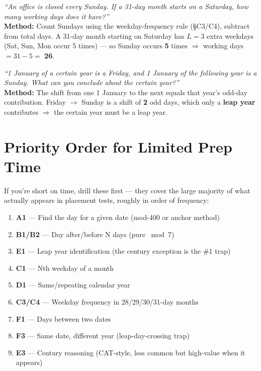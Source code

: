 \documentclass[11pt]{article}
\begin{document}
\begin{examplebox}
\emph{``An office is closed every Sunday. If a 31-day month starts on a Saturday, how many working
days does it have?''} \\
\textbf{Method:} Count Sundays using the weekday-frequency rule (\S C3/C4), subtract from total
days. A 31-day month starting on Saturday has $L=3$ extra weekdays (Sat, Sun, Mon occur 5 times) ---
so Sunday occurs \textbf{5} times $\Rightarrow$ working days $= 31-5 = $ \textbf{26}.
\end{examplebox}

\begin{examplebox}
\emph{``1 January of a certain year is a Friday, and 1 January of the following year is a Sunday.
What can you conclude about the certain year?''} \\
\textbf{Method:} The shift from one 1 January to the next equals that year's odd-day contribution.
Friday $\to$ Sunday is a shift of \textbf{2} odd days, which only a \textbf{leap year} contributes
$\Rightarrow$ the certain year must be a leap year.
\end{examplebox}

\section{Priority Order for Limited Prep Time}

If you're short on time, drill these first --- they cover the large majority of what actually
appears in placement tests, roughly in order of frequency:

\begin{enumerate}[leftmargin=1.6em]
  \item \textbf{A1} --- Find the day for a given date (mod-400 or anchor method)
  \item \textbf{B1/B2} --- Day after/before N days (pure $\bmod 7$)
  \item \textbf{E1} --- Leap year identification (the century exception is the \#1 trap)
  \item \textbf{C1} --- Nth weekday of a month
  \item \textbf{D1} --- Same/repeating calendar year
  \item \textbf{C3/C4} --- Weekday frequency in 28/29/30/31-day months
  \item \textbf{F1} --- Days between two dates
  \item \textbf{F3} --- Same date, different year (leap-day-crossing trap)
  \item \textbf{E3} --- Century reasoning (CAT-style, less common but high-value when it appears)
\end{enumerate}
\end{document}
